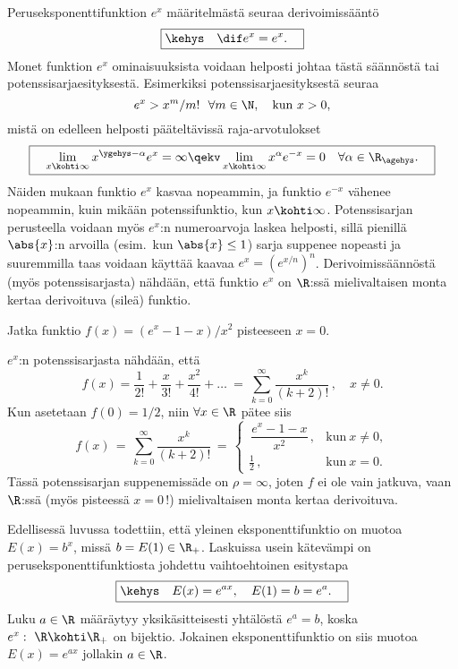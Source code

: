 Peruseksponenttifunktion $e^x$ määritelmästä seuraa derivoimissääntö
\[
\boxed{\kehys\quad \dif e^x = e^x. \quad}
\]
Monet funktion $e^x$ ominaisuuksista voidaan helposti johtaa tästä säännöstä tai 
potenssisarjaesityksestä. Esimerkiksi potenssisarjaesityksestä seuraa 
\[
e^x > x^m/m!\ \ \forall m \in \N, \quad \text{kun}\ x>0, 
\]
mistä on edelleen helposti pääteltävissä raja-arvotulokset
\begin{equation} \label{exp-raja-arvot}
\boxed{\quad \lim_{x\kohti\infty} x^{\ygehys -\alpha}e^x = \infty 
  \qekv \lim_{x\kohti\infty}x^\alpha e^{-x} = 0 \quad \forall \alpha \in \R_{\agehys}. \quad}
\end{equation}
Näiden mukaan funktio $e^x$ kasvaa nopeammin, ja funktio $e^{-x}$ vähenee nopeammin, kuin mikään
potenssifunktio, kun $x\kohti\infty$. Potenssisarjan perusteella voidaan myös $e^x$:n 
numeroarvoja laskea helposti, sillä pienillä $\abs{x}$:n arvoilla (esim.\ kun $\abs{x} \le 1$) 
sarja suppenee nopeasti ja suuremmilla taas voidaan käyttää kaavaa $e^x = (e^{x/n})^n$. 
Derivoimissäännöstä (myös potenssisarjasta) nähdään, että funktio $e^x$ on $\R$:ssä 
mielivaltaisen monta kertaa derivoituva (sileä) funktio. 
\begin{Exa} Jatka funktio $f(x)=(e^x-1-x)/x^2$ pisteeseen $x=0$.
\end{Exa}
\ratk $e^x$:n potenssisarjasta nähdään, että
\[
f(x)= \frac{1}{2!} + \frac{x}{3!} + \frac{x^2}{4!} + \ldots\ 
                           =\ \sum_{k=0}^\infty \frac{x^k}{(k+2)!}\,, \quad x \neq 0.
\]
Kun asetetaan $f(0)=1/2$, niin $\forall x\in\R$ pätee siis
\[
f(x)\,=\,\sum_{k=0}^\infty \frac{x^k}{(k+2)!} 
    \,=\,\begin{cases}
         \,\dfrac{e^x-1-x}{x^2}\,, &\text{kun}\ x \neq 0, \\ \tfrac{1}{2}\,, &\text{kun}\ x=0.
         \end{cases} 
\]
Tässä potenssisarjan suppenemissäde on $\rho=\infty$, joten $f$ ei ole vain jatkuva, vaan
$\R$:ssä (myös pisteessä $x=0$\,!) mielivaltaisen monta kertaa derivoituva. \loppu

Edellisessä luvussa todettiin, että yleinen eksponenttifunktio on muotoa $E(x)=b^x$, missä 
$b=E(1) \in \R_+$. Laskuissa usein kätevämpi on peruseksponenttifunktiosta johdettu 
vaihtoehtoinen esitystapa
\[
\boxed{\kehys\quad E(x)=e^{ax}, \quad E(1)=b=e^a. \quad}
\]
Luku $a\in\R$ määräytyy yksikäsitteisesti yhtälöstä $e^a=b$, koska $e^x:\ \R\kohti\R_+$ on 
bijektio. Jokainen eksponenttifunktio on siis muotoa $E(x)=e^{ax}$ jollakin $a\in\R$. 

